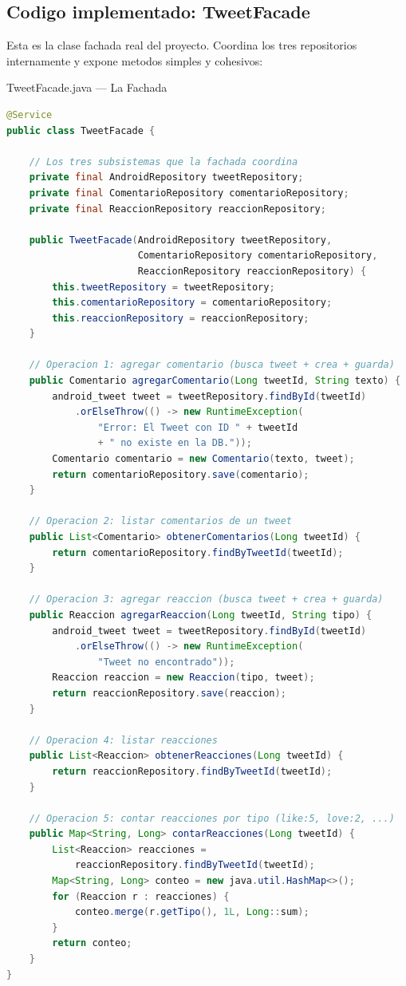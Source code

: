 \documentclass[12pt,a4paper]{article}
\begin{document}
\subsection{Codigo implementado: TweetFacade}

Esta es la clase fachada real del proyecto. Coordina los tres repositorios
internamente y expone metodos simples y cohesivos:

\begin{filebox}{TweetFacade.java --- La Fachada}
\begin{lstlisting}[language=Java]
@Service
public class TweetFacade {

    // Los tres subsistemas que la fachada coordina
    private final AndroidRepository tweetRepository;
    private final ComentarioRepository comentarioRepository;
    private final ReaccionRepository reaccionRepository;

    public TweetFacade(AndroidRepository tweetRepository,
                       ComentarioRepository comentarioRepository,
                       ReaccionRepository reaccionRepository) {
        this.tweetRepository = tweetRepository;
        this.comentarioRepository = comentarioRepository;
        this.reaccionRepository = reaccionRepository;
    }

    // Operacion 1: agregar comentario (busca tweet + crea + guarda)
    public Comentario agregarComentario(Long tweetId, String texto) {
        android_tweet tweet = tweetRepository.findById(tweetId)
            .orElseThrow(() -> new RuntimeException(
                "Error: El Tweet con ID " + tweetId
                + " no existe en la DB."));
        Comentario comentario = new Comentario(texto, tweet);
        return comentarioRepository.save(comentario);
    }

    // Operacion 2: listar comentarios de un tweet
    public List<Comentario> obtenerComentarios(Long tweetId) {
        return comentarioRepository.findByTweetId(tweetId);
    }

    // Operacion 3: agregar reaccion (busca tweet + crea + guarda)
    public Reaccion agregarReaccion(Long tweetId, String tipo) {
        android_tweet tweet = tweetRepository.findById(tweetId)
            .orElseThrow(() -> new RuntimeException(
                "Tweet no encontrado"));
        Reaccion reaccion = new Reaccion(tipo, tweet);
        return reaccionRepository.save(reaccion);
    }

    // Operacion 4: listar reacciones
    public List<Reaccion> obtenerReacciones(Long tweetId) {
        return reaccionRepository.findByTweetId(tweetId);
    }

    // Operacion 5: contar reacciones por tipo (like:5, love:2, ...)
    public Map<String, Long> contarReacciones(Long tweetId) {
        List<Reaccion> reacciones =
            reaccionRepository.findByTweetId(tweetId);
        Map<String, Long> conteo = new java.util.HashMap<>();
        for (Reaccion r : reacciones) {
            conteo.merge(r.getTipo(), 1L, Long::sum);
        }
        return conteo;
    }
}
\end{lstlisting}
\end{filebox}
\end{document}
